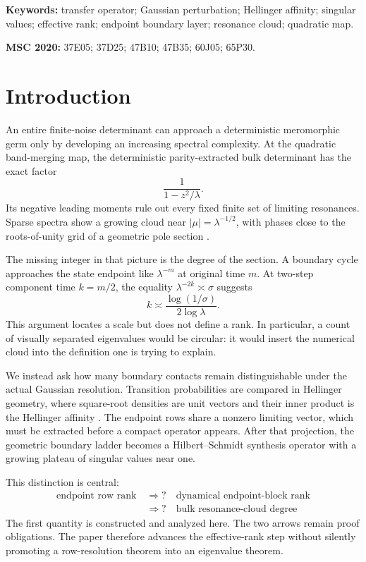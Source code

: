 \documentclass[11pt]{article}
\theoremstyle{definition}
\theoremstyle{remark}
\begin{document}
\noindent\textbf{Keywords:} transfer operator; Gaussian perturbation;
Hellinger affinity; singular values; effective rank; endpoint boundary
layer; resonance cloud; quadratic map.

\medskip
\noindent\textbf{MSC 2020:} 37E05; 37D25; 47B10; 47B35; 60J05; 65P30.

\section{Introduction}
\label{sec:introduction}

An entire finite-noise determinant can approach a deterministic meromorphic
germ only by developing an increasing spectral complexity.  At the quadratic
band-merging map, the deterministic parity-extracted bulk determinant has the
exact factor
\begin{equation}\label{eq:previous-pole}
 \frac1{1-z^2/\lambda}.
\end{equation}
Its negative leading moments rule out every fixed finite set of limiting
resonances.  Sparse spectra show a growing cloud near
$|\mu|=\lambda^{-1/2}$, with phases close to the roots-of-unity grid of a
geometric pole section \citep{WangBulkScattering2026}.

The missing integer in that picture is the degree of the section.  A boundary
cycle approaches the state endpoint like $\lambda^{-m}$ at original time
$m$.  At two-step component time $k=m/2$, the equality
$\lambda^{-2k}\asymp\sigma$ suggests
\begin{equation}\label{eq:heuristic-clock}
 k\asymp\frac{\log(1/\sigma)}{2\log\lambda}.
\end{equation}
This argument locates a scale but does not define a rank.  In particular, a
count of visually separated eigenvalues would be circular: it would insert
the numerical cloud into the definition one is trying to explain.

We instead ask how many boundary contacts remain distinguishable under the
actual Gaussian resolution.  Transition probabilities are compared in
Hellinger geometry, where square-root densities are unit vectors and their
inner product is the Hellinger affinity \citep{LeCamYang2000}.  The endpoint
rows share a nonzero limiting vector, which must be extracted before a compact
operator appears.  After that projection, the geometric boundary ladder
becomes a Hilbert--Schmidt synthesis operator with a growing plateau of
singular values near one.

This distinction is central:
\begin{equation}\label{eq:three-levels}
 \boxed{
 \begin{gathered}
 \text{endpoint row rank}
 \quad\Longrightarrow?\quad
 \text{dynamical endpoint-block rank}\\
 \phantom{\text{endpoint row rank}}\quad\Longrightarrow?\quad
 \text{bulk resonance-cloud degree}
 \end{gathered}}
\end{equation}
The first quantity is constructed and analyzed here.  The two arrows remain
proof obligations.  The paper therefore advances the effective-rank step
without silently promoting a row-resolution theorem into an eigenvalue
theorem.
\end{document}
